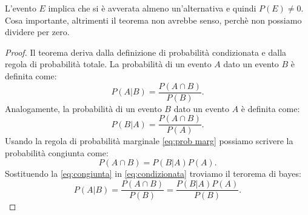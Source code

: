 \documentclass[../main.tex]{subfiles}
\begin{document}
\hfill \break
L'evento $E$ implica che si è avverata almeno un'alternativa e quindi $P(E)\ne 0$. Cosa importante, altrimenti il teorema non avrebbe senso, perchè non possiamo dividere per zero.
\begin{proof}
Il teorema deriva dalla definizione di probabilità condizionata e dalla regola di probabilità totale.
La probabilità di un evento $A$ dato un evento $B$ è definita come:
\begin{equation}\label{eq:condizionata}
    P(A|B)=\frac{P(A\cap B)}{P(B)}.
\end{equation}
Analogamente, la probabilità di un evento $B$ dato un evento $A$ è definita come:
\begin{equation}
    P(B|A)=\frac{P(A\cap B)}{P(A)}.
\end{equation}
Usando la regola di probabilità marginale \ref{eq:prob marg} possiamo scrivere la probabilità congiunta come:
\begin{equation}\label{eq:congiunta}
    P(A \cap B )= P(B|A)P(A).
\end{equation}
Sostituendo la \ref{eq:congiunta} in \ref{eq:condizionata} troviamo il terorema di bayes:
\begin{equation}
    P(A|B)= \frac{P(A \cap B)}{P(B)} =\frac{P(B|A)P(A)}{P(B)}.
\end{equation}
\end{proof}
\end{document}
